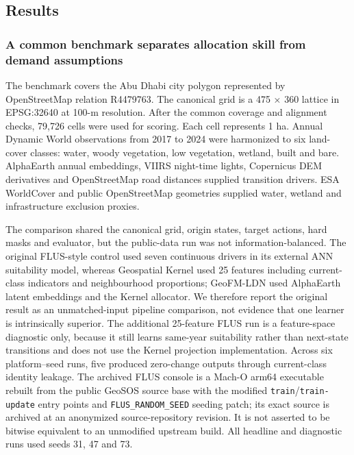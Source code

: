 \documentclass[
]{article}
\begin{document}
\subsection{Results}\label{results}

\subsubsection{A common benchmark separates allocation skill from demand
assumptions}\label{a-common-benchmark-separates-allocation-skill-from-demand-assumptions}

The benchmark covers the Abu Dhabi city polygon represented by
OpenStreetMap relation R4479763. The canonical grid is a 475 × 360
lattice in EPSG:32640 at 100-m resolution. After the common coverage and
alignment checks, 79,726 cells were used for scoring. Each cell
represents 1 ha. Annual Dynamic World observations from 2017 to 2024
were harmonized to six land-cover classes: water, woody vegetation, low
vegetation, wetland, built and bare. AlphaEarth annual embeddings, VIIRS
night-time lights, Copernicus DEM derivatives and OpenStreetMap road
distances supplied transition drivers. ESA WorldCover and public
OpenStreetMap geometries supplied water, wetland and infrastructure
exclusion proxies.

The comparison shared the canonical grid, origin states, target actions,
hard masks and evaluator, but the public-data run was not
information-balanced. The original FLUS-style control used seven
continuous drivers in its external ANN suitability model, whereas
Geospatial Kernel used 25 features including current-class indicators
and neighbourhood proportions; GeoFM-LDN used AlphaEarth latent
embeddings and the Kernel allocator. We therefore report the original
result as an unmatched-input pipeline comparison, not evidence that one
learner is intrinsically superior. The additional 25-feature FLUS run is
a feature-space diagnostic only, because it still learns same-year
suitability rather than next-state transitions and does not use the
Kernel projection implementation. Across six platform--seed runs, five
produced zero-change outputs through current-class identity leakage. The
archived FLUS console is a Mach-O arm64 executable rebuilt from the
public GeoSOS source base with the modified
\texttt{train}/\texttt{train-update} entry points and
\texttt{FLUS\_RANDOM\_SEED} seeding patch; its exact source is archived
at an anonymized source-repository revision. It is not asserted to be
bitwise equivalent to an unmodified upstream build. All headline and
diagnostic runs used seeds 31, 47 and 73.
\end{document}
